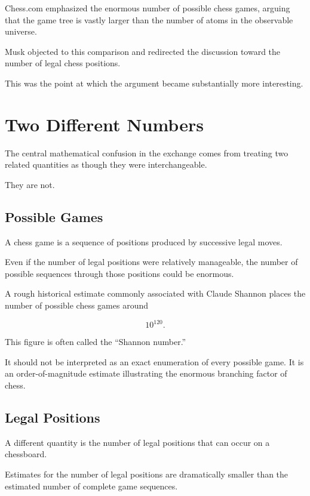 \documentclass[12pt,a4paper]{article}
\begin{document}
Chess.com emphasized the enormous number of possible chess games,
arguing that the game tree is vastly larger than the number of atoms
in the observable universe.

Musk objected to this comparison and redirected the discussion toward
the number of legal chess positions.

This was the point at which the argument became substantially more
interesting.


\section{Two Different Numbers}

The central mathematical confusion in the exchange comes from treating
two related quantities as though they were interchangeable.

They are not.

\subsection{Possible Games}

A chess game is a sequence of positions produced by successive legal
moves.

Even if the number of legal positions were relatively manageable,
the number of possible sequences through those positions could be
enormous.

A rough historical estimate commonly associated with Claude Shannon
places the number of possible chess games around

\[
10^{120}.
\]

This figure is often called the ``Shannon number.''

It should not be interpreted as an exact enumeration of every possible
game. It is an order-of-magnitude estimate illustrating the enormous
branching factor of chess.

\subsection{Legal Positions}

A different quantity is the number of legal positions that can occur
on a chessboard.

Estimates for the number of legal positions are dramatically smaller
than the estimated number of complete game sequences.
\end{document}

